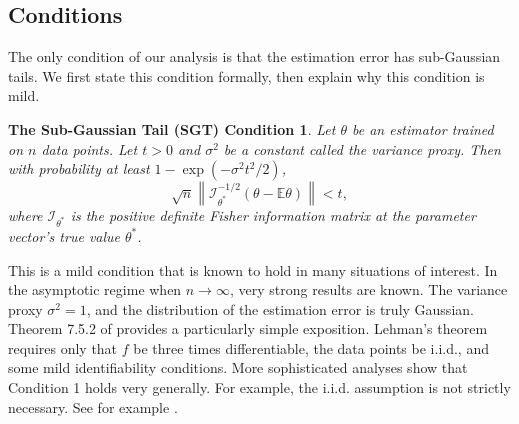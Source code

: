 \documentclass[twoside]{article}
\newtheorem{assumption}{Condition}
\newcommand{\E}{\mathbb{E}}
\newcommand{\w}{\theta}
\newcommand{\wmle}{\hat\w^{mle}}
\newcommand{\wstar}{{\w^{*}}}
\newcommand{\I}{\mathcal I}
\newcommand{\ltwo}[1]{{\lVert {#1} \rVert}}
\newcommand{\ltwobig}[1]{{\left\lVert {#1} \right\rVert}}
\newcommand{\prob}[1]{\Pr\left[{#1}\right]}
\begin{document}
\subsection{Conditions}

The only condition of our analysis is that the estimation error has sub-Gaussian tails.
We first state this condition formally,
then explain why this condition is mild.

%


\newtheorem*{sgt}{The Sub-Gaussian Tail (SGT) Condition}
\begin{sgt}
Let $\theta$ be an estimator trained on $n$ data points.
Let $t>0$ and $\sigma^2$ be a constant called the \emph{variance proxy}.
Then with probability at least $1-\exp(-\sigma^2t^2/2)$,
\begin{equation}
\sqrt n \ltwobig{\I^{-1/2}_\wstar(\theta-\E\theta)} < t
,
\end{equation}
where $\I_\wstar$ is the positive definite Fisher information matrix at the parameter vector's true value $\wstar$.
\end{sgt}

This is a mild condition that is known to hold in many situations of interest.
In the asymptotic regime when $n\to\infty$,
very strong results are known.
The variance proxy $\sigma^2=1$,
and the distribution of the estimation error is truly Gaussian.
Theorem 7.5.2 of \cite{lehmann1999elements} provides a particularly simple exposition.
Lehman's theorem requires only that $f$ be three times differentiable,
the data points be i.i.d.,
and some mild identifiability conditions.
More sophisticated analyses show that Condition 1 holds very generally.
For example, the i.i.d. assumption is not strictly necessary.
See for example \cite{spokoiny2012parametricestimation}.
\end{document}
